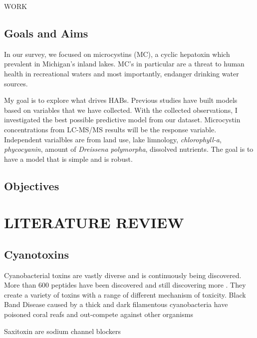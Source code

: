 \documentclass{ou-thesis}
\begin{document}
WORK



\section{Goals and Aims}

In our survey, we focused on microcystins (MC), a cyclic hepatoxin which prevalent in Michigan’s inland lakes. MC’s in particular are a threat to human health in recreational waters and  most importantly, endanger drinking water sources.

My goal is to explore what drives HABs. Previous studies have built models based on variables that we have collected. With the collected observations, I investigated the best possible predictive model from our dataset. Microcystin concentrations from LC-MS/MS results will be the response variable. Independent varialbles are from land use, lake limnology, \emph{chlorophyll-a}, \emph{phycocyanin}, amount of \emph{Dreissena polymorpha}, dissolved nutrients. The goal is to have a model that is simple and is robust.



\section{Objectives}









\chapter{LITERATURE REVIEW}



\section{Cyanotoxins}

Cyanobacterial toxins are vastly diverse and is continuously being discovered. More than 600 peptides have been discovered and still discovering more \cite{welker_cyanobacterial_2006}. They create a variety of toxins with a range of different mechanism of toxicity. Black Band Disease caused by a thick and dark filamentous cyanobacteria have poisoned coral reafs and out-compete against other organisms \cite{meyer_microbiome_2015}

Saxitoxin are sodium channel blockers \cite{moore_richard_cyanobacterial_1993}
\end{document}
